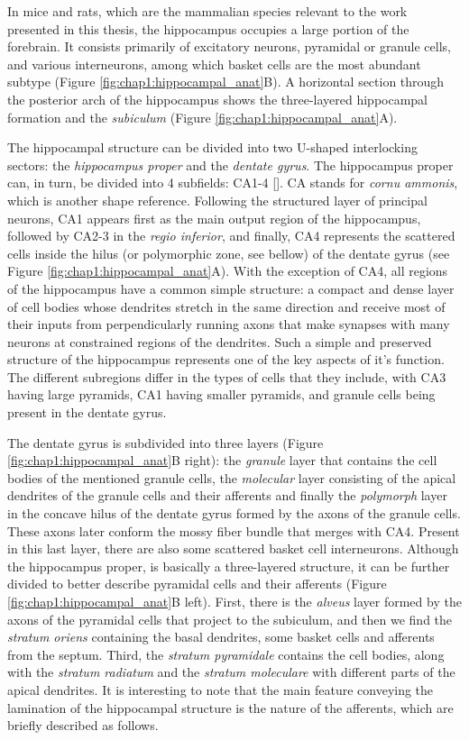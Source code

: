 In mice and rats, which are the mammalian species relevant to the work presented in this thesis, the hippocampus occupies a large portion of the forebrain. 
It consists primarily of excitatory neurons, pyramidal or granule cells, and various interneurons, among which basket cells are the most abundant subtype (Figure \ref{fig:chap1:hippocampal_anat}B). 
A horizontal section through the posterior arch of the hippocampus shows the three-layered hippocampal formation and the \textit{subiculum} (Figure \ref{fig:chap1:hippocampal_anat}A).

The hippocampal structure can be divided into two U-shaped interlocking sectors: the \textit{hippocampus proper} and the \textit{dentate gyrus}.
The hippocampus proper can, in turn, be divided into 4 subfields: CA1-4 [\cite{lorente1934}].
CA stands for \textit{cornu ammonis}, which is another shape reference. 
Following the structured layer of principal neurons, CA1 appears first as the main output region of the hippocampus, followed by CA2-3 in the \textit{regio inferior}, and finally, CA4 represents the scattered cells inside the hilus (or polymorphic zone, see bellow) of the dentate gyrus (see Figure \ref{fig:chap1:hippocampal_anat}A). 
With the exception of CA4, all regions of the hippocampus have a common simple structure: a compact and dense layer of cell bodies whose dendrites stretch in the same direction and receive most of their inputs from perpendicularly running axons that make synapses with many neurons at constrained regions of the dendrites. 
Such a simple and preserved structure of the hippocampus represents one of the key aspects of it's function. 
The different subregions differ in the types of cells that they include, with CA3 having large pyramids, CA1 having smaller pyramids, and granule cells being present in the dentate gyrus. 

The dentate gyrus is subdivided into three layers (Figure \ref{fig:chap1:hippocampal_anat}B right): the \textit{granule} layer that contains the cell bodies of the mentioned granule cells, the \textit{molecular} layer consisting of the apical dendrites of the granule cells and their afferents and finally the \textit{polymorph} layer in the concave hilus of the dentate gyrus formed by the axons of the granule cells.
These axons later conform the mossy fiber bundle that merges with CA4. 
Present in this last layer, there are also some scattered basket cell interneurons.
Although the hippocampus proper, is basically a three-layered structure, it can be further divided to better describe pyramidal cells and their afferents (Figure \ref{fig:chap1:hippocampal_anat}B left).
First, there is the \textit{alveus} layer formed by the axons of the pyramidal cells that project to the subiculum, and then we find the \textit{stratum oriens} containing the basal dendrites, some basket cells and afferents from the septum.
Third, the \textit{stratum pyramidale} contains the cell bodies, along with the \textit{stratum radiatum} and the \textit{stratum moleculare} with different parts of the apical dendrites.
It is interesting to note that the main feature conveying the lamination of the hippocampal structure is the nature of the afferents, which are briefly described as follows.

